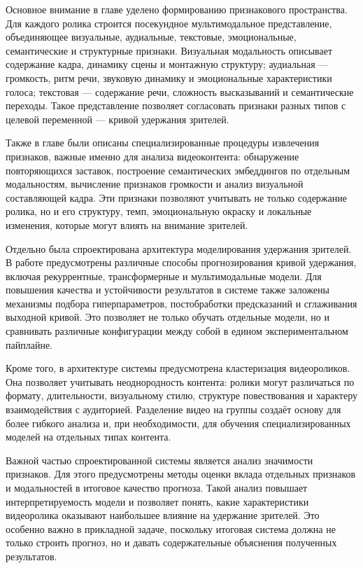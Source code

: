 \documentclass[times]{itmo-student-thesis}
\begin{document}
Основное внимание в главе уделено формированию признакового пространства. Для каждого ролика строится посекундное мультимодальное представление, объединяющее визуальные, аудиальные, текстовые, эмоциональные, семантические и структурные признаки. Визуальная модальность описывает содержание кадра, динамику сцены и монтажную структуру; аудиальная — громкость, ритм речи, звуковую динамику и эмоциональные характеристики голоса; текстовая — содержание речи, сложность высказываний и семантические переходы. Такое представление позволяет согласовать признаки разных типов с целевой переменной — кривой удержания зрителей.

Также в главе были описаны специализированные процедуры извлечения признаков, важные именно для анализа видеоконтента: обнаружение повторяющихся заставок, построение семантических эмбеддингов по отдельным модальностям, вычисление признаков громкости и анализ визуальной составляющей кадра. Эти признаки позволяют учитывать не только содержание ролика, но и его структуру, темп, эмоциональную окраску и локальные изменения, которые могут влиять на внимание зрителей.

Отдельно была спроектирована архитектура моделирования удержания зрителей. В работе предусмотрены различные способы прогнозирования кривой удержания, включая рекуррентные, трансформерные и мультимодальные модели. Для повышения качества и устойчивости результатов в системе также заложены механизмы подбора гиперпараметров, постобработки предсказаний и сглаживания выходной кривой. Это позволяет не только обучать отдельные модели, но и сравнивать различные конфигурации между собой в едином экспериментальном пайплайне.

Кроме того, в архитектуре системы предусмотрена кластеризация видеороликов. Она позволяет учитывать неоднородность контента: ролики могут различаться по формату, длительности, визуальному стилю, структуре повествования и характеру взаимодействия с аудиторией. Разделение видео на группы создаёт основу для более гибкого анализа и, при необходимости, для обучения специализированных моделей на отдельных типах контента.

Важной частью спроектированной системы является анализ значимости признаков. Для этого предусмотрены методы оценки вклада отдельных признаков и модальностей в итоговое качество прогноза. Такой анализ повышает интерпретируемость модели и позволяет понять, какие характеристики видеоролика оказывают наибольшее влияние на удержание зрителей. Это особенно важно в прикладной задаче, поскольку итоговая система должна не только строить прогноз, но и давать содержательные объяснения полученных результатов.
\end{document}
